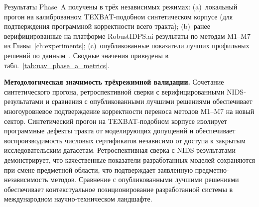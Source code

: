 Результаты Phase~A получены в трёх независимых режимах: (a)~локальный
прогон на калиброванном TEXBAT-подобном синтетическом корпусе (для
подтверждения программной корректности всего тракта); (b)~ранее
верифицированные на платформе \textsf{RobustIDPS.ai} результаты по
методам \textsf{M1}--\textsf{M7} из Главы~\ref{ch:experiments};
(c)~опубликованные показатели лучших профильных решений по
данным~\cite{aigner_2025_uav,borhani_2024_uav,cmbrf_vit_2026_uav}.
Сводные значения приведены в табл.~\ref{tab:uav_phase_a_metrics}.

\noindent\textbf{Методологическая значимость трёхрежимной
валидации.} Сочетание синтетического прогона, ретроспективной
сверки с верифицированными NIDS-результатами и сравнения с
опубликованными лучшими решениями обеспечивает многоуровневое
подтверждение корректности переноса методов M1--M7 на новый сектор.
Синтетический прогон на TEXBAT-подобном корпусе изолирует
программные дефекты тракта от моделирующих допущений и
обеспечивает воспроизводимость числовых сертификатов независимо от
доступа к закрытым исследовательским датасетам. Ретроспективная
сверка с NIDS-результатами демонстрирует, что качественные
показатели разработанных моделей сохраняются при смене предметной
области, что подтверждает заявленную предметно-независимость
методов. Сравнение с опубликованными лучшими решениями
обеспечивает контекстуальное позиционирование разработанной
системы в международном научно-техническом ландшафте.

